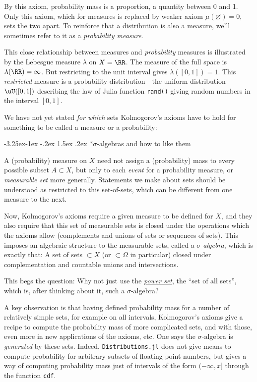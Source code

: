 \documentclass{juliacon}
\makeatletter
\renewcommand\subsection{\@startsection{subsection}{2}{\z@}%
{-3.25ex\@plus -1ex \@minus -.2ex}%
{1.5ex \@plus .2ex}%
{\normalfont\bfseries}}
\makeatother
\begin{document}
By this axiom, probability mass is a proportion, a quantity between 0 and 1. Only this axiom, which for measures is replaced by weaker axiom $\mu(\varnothing) = 0$, sets the two apart. To reinforce that a distribution is also a measure, we'll sometimes refer to it as a \emph{probability measure}.

This close relationship between measures and \emph{probability} measures is illustrated by the Lebesgue measure $\lambda$ on $X=\RR$. The measure of the full space is $\lambda(\RR) = \infty$. But restricting to the unit interval gives $\lambda([0,1])=1$. This \emph{restricted} measure is a probability distribution---the uniform distribution $\uU([0,1])$ describing the law of Julia function \verb|rand()| giving random numbers in the interval $[0,1]$.

We have not yet stated \emph{for which} sets Kolmogorov's axioms have to hold for something to be called a measure or a probability:

\subsection*{$\sigma$-algebras and how to like them}

A (probability) measure on $X$ need not assign a (probability) mass to every possible subset $A\subset X$,
but only to each \emph{event} for a probability measure, or \emph{measurable set} more generally.
Statements we make about sets should be understood as restricted to this set-of-sets, which can be different from one measure to the next.

Now, Kolmogorov's axioms require a given measure to be defined for $X$, and they also require that this set of measurable sets is closed under the operations which the axioms allow (complements and unions of sets or sequences of sets). This imposes an algebraic structure to the measurable sets, called a \emph{$\sigma$-algebra}, which is exactly that: A set of sets $\subset X$ (or $\subset \Omega$ in particular) closed under complementation and countable unions and intersections.

This begs the question: Why not just use the \href{https://en.wikipedia.org/wiki/Power_set}{\emph{power set}}, the ``set of all sets'', which is, after thinking about it, such a $\sigma$-algebra?

A key observation is that having defined probability mass for a number of relatively simple sets, for example on all intervals,
Kolmogorov's axioms give a recipe to compute the probability mass of more complicated sets, and with those, even more in new applications of the axioms, etc.
One says the $\sigma$-algebra is \emph{generated} by these sets.
Indeed, \verb|Distributions.jl| does not give means to compute probability for arbitrary subsets of floating point numbers,
but gives a way of computing probability mass just of intervals of the form $(-\infty, x]$ through the function \verb|cdf|.
\end{document}
